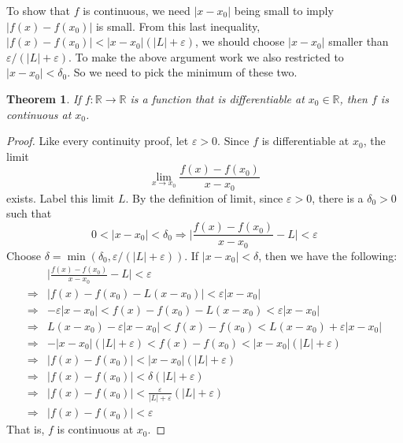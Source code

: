 \documentclass{article}
\theoremstyle{normal}
\theoremstyle{plain}
\newtheorem{theorem}{Theorem}
\begin{document}
    To show that $f$ is continuous, we need $|x-x_{0}|$ being small to
    imply $|f(x)-f(x_{0})|$ is small. From this last inequality,
    $|f(x)-f(x_{0})|<|x-x_{0}|(|L|+\varepsilon)$, we should choose
    $|x-x_{0}|$ smaller than $\varepsilon/(|L|+\varepsilon)$. To make the
    above argument work we also restricted to $|x-x_{0}|<\delta_{0}$. So we
    need to pick the minimum of these two.
    \begin{theorem}
        If $f:\mathbb{R}\rightarrow\mathbb{R}$ is a function that is
        differentiable at $x_{0}\in\mathbb{R}$, then $f$ is continuous
        at $x_{0}$.
    \end{theorem}
    \begin{proof}
        Like every continuity proof, let $\varepsilon>0$. Since $f$ is
        differentiable at $x_{0}$, the limit
        \begin{equation}
            \lim_{x\rightarrow{x}_{0}}\frac{f(x)-f(x_{0})}{x-x_{0}}
        \end{equation}
        exists. Label this limit $L$. By the definition of limit, since
        $\varepsilon>0$, there is a $\delta_{0}>0$ such that
        \begin{equation}
            0<|x-x_{0}|<\delta_{0}\Rightarrow
            \Big|\frac{f(x)-f(x_{0})}{x-x_{0}}-L\Big|<\varepsilon
        \end{equation}
        Choose $\delta=\min(\delta_{0},\varepsilon/(|L|+\varepsilon))$.
        If $|x-x_{0}|<\delta$, then we have the following:
        \begin{align}
            &\Big|\frac{f(x)-f(x_{0})}{x-x_{0}}-L\Big|<\varepsilon\\
            \Rightarrow&|f(x)-f(x_{0})-L(x-x_{0})|<\varepsilon|x-x_{0}|\\
            \Rightarrow&-\varepsilon|x-x_{0}|<
                f(x)-f(x_{0})-L(x-x_{0})<\varepsilon|x-x_{0}|\\
            \Rightarrow&
                L(x-x_{0})-\varepsilon|x-x_{0}|<
                    f(x)-f(x_{0})<L(x-x_{0})+\varepsilon|x-x_{0}|\\
            \Rightarrow&
                -|x-x_{0}|(|L|+\varepsilon)<f(x)-f(x_{0})
                    <|x-x_{0}|(|L|+\varepsilon)\\
            \Rightarrow&
                |f(x)-f(x_{0})|<|x-x_{0}|(|L|+\varepsilon)\\
            \Rightarrow&
                |f(x)-f(x_{0})|<\delta(|L|+\varepsilon)\\
            \Rightarrow&
                |f(x)-f(x_{0})|<\frac{\varepsilon}{|L|+\varepsilon}
                    (|L|+\varepsilon)\\
            \Rightarrow&|f(x)-f(x_{0})|<\varepsilon
        \end{align}
        That is, $f$ is continuous at $x_{0}$.
    \end{proof}
\end{document}
